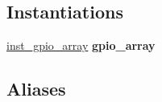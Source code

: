 \subsection*{Instantiations}
 \begin{DoxyCompactItemize}
\item 
\mbox{\label{classGPIO__v1__0__S00__AXI_1_1arch__imp_a4cbd4768605eabd1ee23cba96408de9b}} 
\hyperlink{classGPIO__v1__0__S00__AXI_1_1arch__imp_a4cbd4768605eabd1ee23cba96408de9b}{inst\+\_\+gpio\+\_\+array}  {\bfseries gpio\+\_\+array}   
\end{DoxyCompactItemize}
\subsection*{Aliases}
